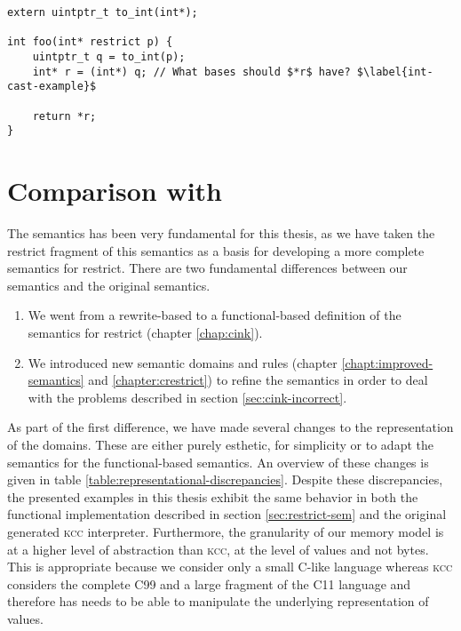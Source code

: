 \begin{code}
\begin{verbatim}
extern uintptr_t to_int(int*);

int foo(int* restrict p) {
    uintptr_t q = to_int(p);
    int* r = (int*) q; // What bases should $*r$ have? $\label{int-cast-example}$

    return *r;
}
\end{verbatim}
\end{code}

\newpage

\section{Comparison with \cink{}}\label{sec:representational-discrepancies}
The \cink{} semantics has been very fundamental for this thesis, as we have
taken the restrict fragment of this semantics as a basis for developing a more complete semantics for restrict.
There are two fundamental differences between our semantics and the original \cink{} semantics.
\begin{enumerate}
    \item We went from a rewrite-based to a functional-based definition of the \cink{} semantics for restrict (chapter \ref{chap:cink}).
    \item We introduced new semantic domains and rules (chapter \ref{chapt:improved-semantics} and \ref{chapter:crestrict}) to refine the semantics in order to deal with the problems described in section \ref{sec:cink-incorrect}.
\end{enumerate}

As part of the first difference, we have made several changes to the representation of the \cink{} domains.
These are either purely esthetic, for simplicity or to adapt the semantics for the functional-based semantics.
An overview of these changes is given in table  \ref{table:representational-discrepancies}.
Despite these discrepancies, the presented examples in this thesis exhibit the same behavior in both the functional
implementation described in section \ref{sec:restrict-sem} and the original generated \textsc{kcc} interpreter.
Furthermore, the granularity of our memory model is at a higher level of abstraction than \textsc{kcc}, \ie at the level of values and not bytes.
This is appropriate because we consider only a small C-like language whereas \textsc{kcc} considers the complete C99 
and a large fragment of the C11 language 
and therefore has needs to be able to manipulate the underlying representation of values.

